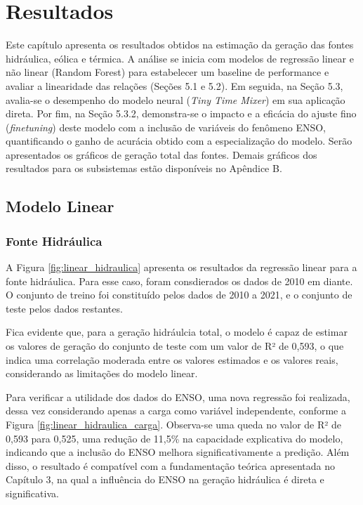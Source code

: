 \chapter{Resultados}
Este capítulo apresenta os resultados obtidos na estimação da geração das fontes hidráulica, eólica e térmica. A análise 
se inicia com modelos de regressão linear e não linear (Random Forest) para estabelecer um baseline de performance e 
avaliar a linearidade das relações (Seções 5.1 e 5.2). Em seguida, na Seção 5.3, avalia-se o desempenho do modelo 
neural (\textit{Tiny Time Mixer}) em sua aplicação direta. Por fim, na Seção 5.3.2, demonstra-se o impacto e a 
eficácia do ajuste fino (\textit{finetuning}) deste modelo com a inclusão de variáveis do fenômeno ENSO, quantificando o ganho de 
acurácia obtido com a especialização do modelo. Serão apresentados os gráficos de geração total das fontes. Demais gráficos 
dos resultados para os subsistemas estão disponíveis no Apêndice B.

\section{Modelo Linear}
\subsection{Fonte Hidráulica}
A Figura \ref{fig:linear_hidraulica} apresenta os resultados da regressão linear para a fonte hidráulica. Para esse caso,
foram consdierados os dados de 2010 em diante. O conjunto de treino foi constituído pelos dados de 2010 a 2021, e o 
conjunto de teste pelos dados restantes. 

\begin{figure}[!ht]
  {}
  {}
\end{figure}
Fica evidente que, para a geração hidráulcia total, o modelo é capaz de estimar os valores de geração do conjunto de teste
com um valor de R² de 0,593, o que indica uma correlação moderada entre os valores estimados e os valores reais, considerando
as limitações do modelo linear. 

Para verificar a utilidade dos dados do ENSO, uma nova regressão foi realizada, dessa vez
considerando apenas a carga como variável independente, conforme a Figura \ref{fig:linear_hidraulica_carga}. Observa-se 
uma queda no valor de R² de 0,593 para 0,525, uma redução de 11,5\% na capacidade explicativa do modelo, indicando que a 
inclusão do ENSO melhora significativamente a predição. Além disso, o resultado é compatível com a fundamentação teórica 
apresentada no Capítulo 3, na qual a influência do ENSO na geração hidráulica é direta e significativa.

